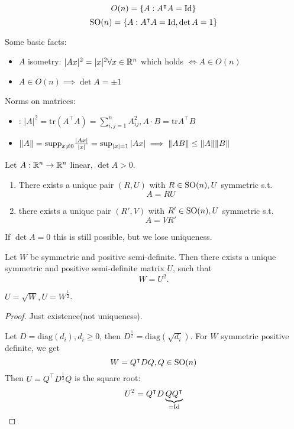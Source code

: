 \begin{definition}\label{def:1.2}
    \[O(n)=\{A:A^\intercal A=\text{Id}\}\]
    \[{\text{SO}}(n)=\{A:A^\intercal A=\text{Id}, \det A=1\}\]
\end{definition}

Some basic facts: 
\begin{itemize}
    \item \(A\) isometry: \(|Ax|^2=|x|^2\forall x\in \mathbb{R}^n\) which holds \(\iff A\in O(n)\)
    \item \(A\in O(n)\implies \det A = \pm 1\)
\end{itemize}

Norms on matrices:
\begin{itemize}
    \item {}: \(|A|^2=\text{tr}(A^\intercal A)=\sum_{i,j=1}^n A_{ij}^2, A\cdot B=\text{tr}A^\intercal B\)
    \item {} \(\Vert A \Vert = \text{supp}_{x\neq 0} \frac{|Ax|}{|x|}=\sup_{|x|=1}|Ax|\implies \Vert AB\Vert \leq \Vert A\Vert\Vert B\Vert \)
\end{itemize}

\begin{lemma}\label{lem:1.3}
    Let \(A:\mathbb{R}^n\to\mathbb{R}^n\) linear, \(\det A>0\).
    \begin{enumerate}
        \item There exists a unique pair \((R,U)\) with \(R\in {\text{SO}}(n), U\) symmetric s.t. \[A=RU\]
        \item there exists a unique pair \((R',V)\) with \(R'\in {\text{SO}}(n), U\) symmetric s.t. \[A=VR'\]
    \end{enumerate}
    If \(\det A=0\) this is still possible, but we lose uniqueness.
\end{lemma}

\begin{theorem}\label{thm:1.4}
    Let \(W\) be symmetric and positive semi-definite. 
    Then there exists a unique symmetric and positive semi-definite matrix \(U\), such that \[W=U^2.\] 
\end{theorem}
 \(U=\sqrt{W},U=W^{\frac{1}{2}}\).

\begin{proof}
    Just existence(not uniqueness).

    Let \(D=\text{diag}(d_i),d_i\geq 0\), then \(D^{\frac{1}{2}}=\text{diag}(\sqrt{d_i})\).
    For \(W\) symmetric positive definite, we get \[W=Q^\intercal D Q, Q\in {\text{SO}}(n)\]
    Then \(U=Q^\intercal D^{\frac{1}{2}}Q\) is the square root: \[U^2=Q^\intercal D \underbrace{QQ^\intercal}_{=\text{Id}}\] 
\end{proof}

